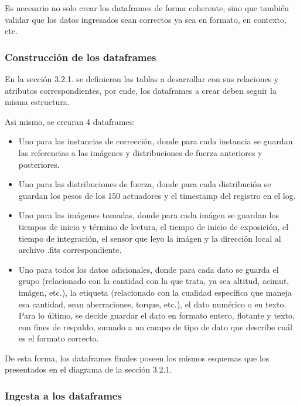 Es necesario no solo crear los dataframes de forma coherente, sino que también validar que los datos ingresados sean correctos ya sea en formato, en contexto, etc.

\subsubsection{Construcción de los dataframes}

En la sección 3.2.1. se definieron las tablas a desarrollar con sus relaciones y atributos correspondientes, por ende, los dataframes a crear deben seguir la misma estructura.

Asi mismo, se crearan 4 dataframes:

\begin{itemize}

    \item Uno para las instancias de corrección, donde para cada instancia se guardan las referencias a las imágenes y distribuciones de fuerza anteriores y posteriores.

    \item Uno para las distribuciones de fuerza, donde para cada distribución se guardan los pesos de los 150 actuadores y el timestamp del registro en el log.

    \item Uno para las imágenes tomadas, donde para cada imágen se guardan los tiempos de inicio y término de lectura, el tiempo de inicio de exposición, el tiempo de integración, el sensor que leyo la imágen y la dirección local al archivo .fits correspondiente.

    \item Uno para todos los datos adicionales, donde para cada dato se guarda el grupo (relacionado con la cantidad con la que trata, ya sea altitud, acimut, imágen, etc.), la etiqueta (relacionado con la cualidad específica que maneja esa cantidad, sean aberraciones, torque, etc.), el dato numérico o en texto. Para lo último, se decide guardar el dato en formato entero, flotante y texto, con fines de respaldo, sumado a un campo de tipo de dato que describe cuál es el formato correcto.
    
\end{itemize}

De esta forma, los dataframes finales poseen los mismos esquemas que los presentados en el diagrama de la sección 3.2.1.

\subsubsection{Ingesta a los dataframes}

